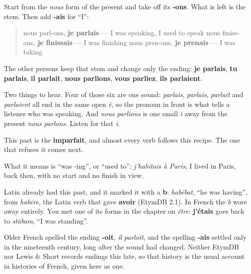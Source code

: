 \begin{grammarlens}[title={Grammar Lens: one stem, one set of endings}]
Start from the \emph{nous} form of the present and take off its \textbf{-ons}. What is left is the stem. Then add \textbf{-ais} for \textquotedblleft{}I\textquotedblright{}:

\begin{quote}
nous parl-ons, \textbf{je parlais} — I was speaking, I used to speak nous finiss-ons, \textbf{je finissais} — I was finishing nous pren-ons, \textbf{je prenais} — I was taking
\end{quote}

The other persons keep that stem and change only the ending: \textbf{je parlais}, \textbf{tu parlais}, \textbf{il parlait}, \textbf{nous parlions}, \textbf{vous parliez}, \textbf{ils parlaient}.

Two things to hear. Four of those six are one sound: \emph{parlais}, \emph{parlais}, \emph{parlait} and \emph{parlaient} all end in the same open \emph{è}, so the pronoun in front is what tells a listener who was speaking. And \emph{nous parlions} is one small \emph{i} away from the present \emph{nous parlons}. Listen for that \emph{i}.

This past is the \textbf{imparfait}, and almost every verb follows this recipe. The one that refuses it comes next.

What it means is \textquotedblleft{}was ‑ing\textquotedblright{}, or \textquotedblleft{}used to\textquotedblright{}: \emph{j'habitais à Paris}, I lived in Paris, back then, with no start and no finish in view.
\end{grammarlens}

\begin{cousinweb}
Latin already had this past, and it marked it with a \textbf{b}: \emph{habēbat}, \textquotedblleft{}he was having\textquotedblright{}, from \emph{habēre}, the Latin verb that gave \textbf{avoir} (EtymDB 2.1). In French the \emph{b} wore away entirely. You met one of its forms in the chapter on \emph{être}: \textbf{j'étais} goes back to \emph{stābam}, \textquotedblleft{}I was standing\textquotedblright{}.

Older French spelled the ending \textbf{-oit}, \emph{il parloit}, and the spelling \textbf{-ais} settled only in the nineteenth century, long after the sound had changed. Neither EtymDB nor Lewis \& Short records endings this late, so that history is the usual account in histories of French, given here as one.
\end{cousinweb}

